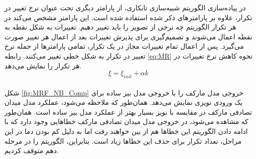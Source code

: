 \documentclass[11.5pt,a4paper]{article}
\begin{document}
در پیاده‌سازی الگوریتم شبیه‌سازی تابکاری، از پارامتر دیگری تحت عنوان نرخ تغییر در تکرار، علاوه بر پارامترهای ذکر شده استفاده شده است. این پارامتر مشخص می‌کند در هر تکرار الگوریتم چه نرخی از تصویر را باید تغییر دهیم. تغییرات به شکل نقطه به نقطه اعمال می‌شوند و تصمیم‌گیری برای پذیرش تغییرات بعد از اعمال هر تغییر صورت می‌گیرد. پس از اعمال تمام تغییرات مجاز در یک تکرار، تمامی پارامترها از جمله نرخ تغییر در تکرار به شکل خطی تغییر می‌کنند. رابطه
\ref{eq:MR}
نحوه کاهش نرخ تغییرات در هر تکرار را نمایش می‌دهد.
\begin{equation}
\label{eq:MR}
\xi =  \xi_{init} + \alpha k
\end{equation}
\\
شکل
\ref{fig:MRF_NB_Comp}
خروجی مدل مارکف را با خروجی مدل بیز ساده برای یک ورودی نویزی نمایش ‌می‌دهد. همان‌طور که ملاحظه می‌شود، عملکرد مدل میدان تصادفی مارکف در مقایسه با نویز بسیار بهتر از عملکرد مدل بیز ساده است.
همان‌طور که مشاهده می‌شود، در خروجی مدل میدان تصادفی مارکف خطاهایی وجود دارد که با ادامه دادن الگوریتم این خطاها هم از بین خواهند رفت اما به دلیل کم بودن دما در این مراحل، تعداد تکرار برای حذف این خطاها زیاد است. بنابراین، الگوریتم را در مرحله دهم متوقف کردیم.
\end{document}
